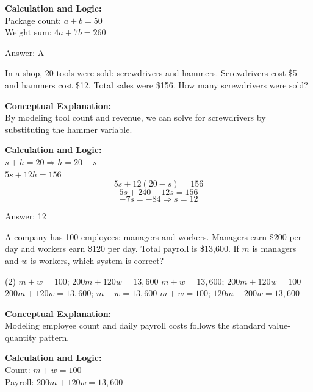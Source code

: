\documentclass[11pt,paper=a4,answers]{exam}
\begin{document}
\begin{questions}
\begin{solution}
\vspace{10pt}
\textbf{Calculation and Logic:} \\
Package count: $a + b = 50$ \\
Weight sum: $4a + 7b = 260$

\vspace{15pt}
Answer: \colorbox{yellow!100}{A}
\end{solution}

\question
In a shop, 20 tools were sold: screwdrivers and hammers. Screwdrivers cost \$5 and hammers cost \$12. Total sales were \$156. How many screwdrivers were sold?

\begin{solution}
\textbf{Conceptual Explanation:} \\
By modeling tool count and revenue, we can solve for screwdrivers by substituting the hammer variable.

\vspace{10pt}
\textbf{Calculation and Logic:} \\
$s + h = 20 \Rightarrow h = 20 - s$ \\
$5s + 12h = 156$ \\
\[5s + 12(20 - s) = 156\]
\[5s + 240 - 12s = 156\]
\[-7s = -84 \Rightarrow s = 12\]

\vspace{15pt}
Answer: \colorbox{yellow!100}{12}
\end{solution}

\question
A company has 100 employees: managers and workers. Managers earn \$200 per day and workers earn \$120 per day. Total payroll is \$13,600. If $m$ is managers and $w$ is workers, which system is correct?
\begin{tasks}(2)
    \task $m + w = 100$; $200m + 120w = 13,600$
    \task $m + w = 13,600$; $200m + 120w = 100$
    \task $200m + 120w = 13,600$; $m + w = 13,600$
    \task $m + w = 100$; $120m + 200w = 13,600$
\end{tasks}

\begin{solution}
\textbf{Conceptual Explanation:} \\
Modeling employee count and daily payroll costs follows the standard value-quantity pattern.

\vspace{10pt}
\textbf{Calculation and Logic:} \\
Count: $m + w = 100$ \\
Payroll: $200m + 120w = 13,600$


\end{solution}
\end{questions}
\end{document}
